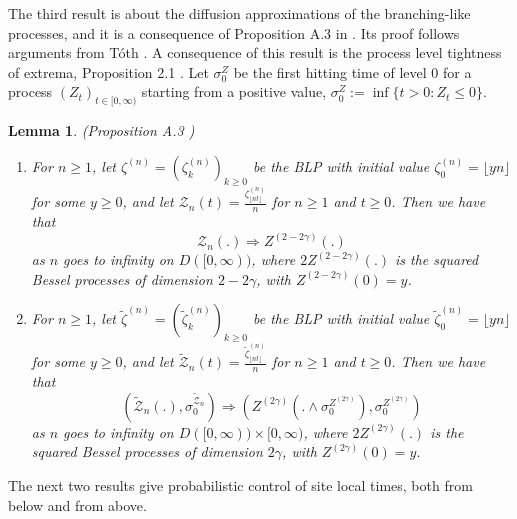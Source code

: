 \documentclass[twoside,12pt, a4paper, final]{article}
\newtheorem{lemma}{Lemma}[section]
\numberwithin{equation}{section}
\theoremstyle{remark}
\begin{document}
	The third result is about the diffusion approximations of the branching-like processes, and it is a consequence of Proposition A.3 in \cite{KMP23}. Its proof follows arguments from T\'{o}th \cite{T96}. A consequence of this result is the process level tightness of extrema, Proposition 2.1 \cite{KMP23}. 
	Let $\sigma_0^Z$ be the first hitting time of level $0$ for a process $\left( Z_t \right) _{t \in [0,\infty )}$ starting from a positive value, $\sigma_0^Z := \inf \{t>0: Z_t \le 0\} $.
	\begin{lemma}(Proposition A.3 \cite{KMP23})\label{lm: diffusion approximation of blp}
		\begin{enumerate}
			\item 
			For $n\geq 1$, let $\zeta^{(n)}=(\zeta^{(n)}_k)_{k\geq 0 }  $ be the BLP with initial value $\zeta^{(n)}_0 = \lfloor yn \rfloor$ for some $y \geq 0$, and let $\mathcal{Z}_n(t) = \frac{\zeta^{(n)}_{\lfloor nt \rfloor}}{n}$ for $n\geq 1$ and $t\geq 0$. Then we have that 
			\[
			\mathcal{Z}_n(.) \Longrightarrow Z^{(2-2\gamma)}(.)
			\] 
			as $n$ goes to infinity on $D([0,\infty))$, where $2Z^{(2-2\gamma)}(.)$ is the squared Bessel processes of dimension $2-2\gamma$, with $Z^{(2 - 2 \gamma)}(0) = y$.
			
			\item
			For $n\geq 1$, let $\tilde\zeta^{(n)}=(\tilde\zeta^{(n)}_k)_{k\geq 0 }  $ be the BLP with initial value $\tilde\zeta^{(n)}_0 = \lfloor yn \rfloor$ for some $y \geq 0$, and let $\tilde{\mathcal{Z}}_n(t) = \frac{\tilde\zeta^{(n)}_{\lfloor nt \rfloor}}{n}$ for $n\geq 1$ and $t\geq 0$. Then we have that 
			\[
			\left(\tilde{\mathcal{Z}}_n(.), \sigma_0^{\tilde{\mathcal{Z}}_n}\right) 
			\Longrightarrow \left(Z^{(2\gamma)}(. \wedge \sigma_0^{Z^{(2 \gamma)}}), \sigma_0^{Z^{(2 \gamma)}}\right)
			\]
			as $n$ goes to infinity on $D([0,\infty)) \times [0,\infty )$, where $2Z^{(2\gamma)}(.)$ is the squared Bessel processes of dimension $2\gamma$, with $Z^{( 2 \gamma)}(0) = y$.
		\end{enumerate}
		
		
	\end{lemma}
	
	
	The next two results give probabilistic control of site local times, both from below and from above.
	
\end{document}
